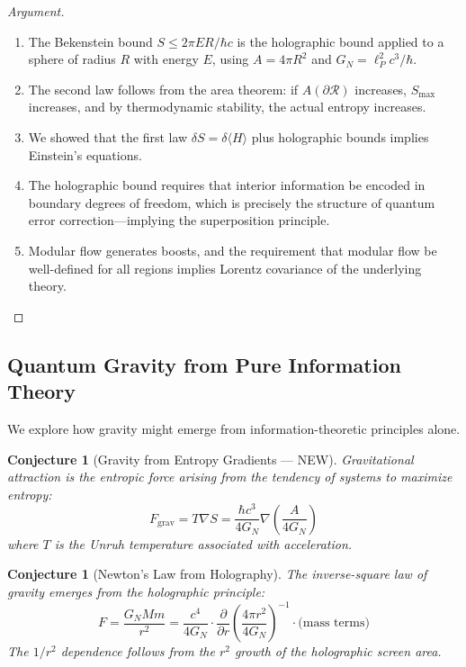 \documentclass[12pt,a4paper]{article}
\newtheorem{conjecture}[theorem]{Conjecture}
\begin{document}
\begin{proof}[Argument]
\begin{enumerate}
    \item The Bekenstein bound $S \leq 2\pi E R / \hbar c$ is the holographic bound applied to a sphere of radius $R$ with energy $E$, using $A = 4\pi R^2$ and $G_N = \ell_P^2 c^3/\hbar$.
    
    \item The second law follows from the area theorem: if $A(\partial \mathcal{R})$ increases, $S_{\text{max}}$ increases, and by thermodynamic stability, the actual entropy increases.
    
    \item We showed that the first law $\delta S = \delta \langle H \rangle$ plus holographic bounds implies Einstein's equations.
    
    \item The holographic bound requires that interior information be encoded in boundary degrees of freedom, which is precisely the structure of quantum error correction---implying the superposition principle.
    
    \item Modular flow generates boosts, and the requirement that modular flow be well-defined for all regions implies Lorentz covariance of the underlying theory.
\end{enumerate}
\end{proof}

\subsection{Quantum Gravity from Pure Information Theory}

We explore how gravity might emerge from information-theoretic principles alone.

\begin{conjecture}[Gravity from Entropy Gradients --- NEW]
Gravitational attraction is the \textit{entropic force} arising from the tendency of systems to maximize entropy:
\begin{equation}
F_{\text{grav}} = T \nabla S = \frac{\hbar c^3}{4 G_N} \nabla \left( \frac{A}{4 G_N} \right)
\end{equation}
where $T$ is the Unruh temperature associated with acceleration.
\end{conjecture}

\begin{conjecture}[Newton's Law from Holography]
The inverse-square law of gravity emerges from the holographic principle:
\begin{equation}
F = \frac{G_N M m}{r^2} = \frac{c^4}{4G_N} \cdot \frac{\partial}{\partial r}\left( \frac{4\pi r^2}{4 G_N} \right)^{-1} \cdot \text{(mass terms)}
\end{equation}
The $1/r^2$ dependence follows from the $r^2$ growth of the holographic screen area.
\end{conjecture}
\end{document}
